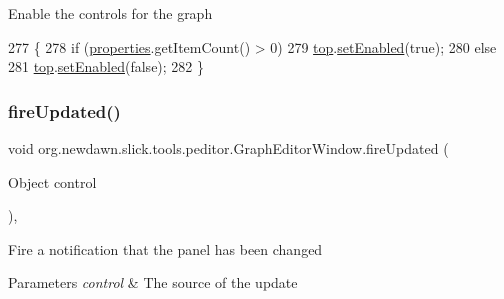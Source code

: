 Enable the controls for the graph 
\begin{DoxyCode}
277                                   \{
278         \textcolor{keywordflow}{if} (\mbox{\hyperlink{classorg_1_1newdawn_1_1slick_1_1tools_1_1peditor_1_1_graph_editor_window_ac9d1313ef13023ef8d250b689e52ff12}{properties}}.getItemCount() > 0)
279             \mbox{\hyperlink{classorg_1_1newdawn_1_1slick_1_1tools_1_1peditor_1_1_graph_editor_window_a1c8bea1ddf9867ec10b2347657b369f3}{top}}.\mbox{\hyperlink{classorg_1_1newdawn_1_1slick_1_1tools_1_1peditor_1_1_default_panel_ae7d7b9c33e70e3725f76d561955aac38}{setEnabled}}(\textcolor{keyword}{true});
280         \textcolor{keywordflow}{else}
281             \mbox{\hyperlink{classorg_1_1newdawn_1_1slick_1_1tools_1_1peditor_1_1_graph_editor_window_a1c8bea1ddf9867ec10b2347657b369f3}{top}}.\mbox{\hyperlink{classorg_1_1newdawn_1_1slick_1_1tools_1_1peditor_1_1_default_panel_ae7d7b9c33e70e3725f76d561955aac38}{setEnabled}}(\textcolor{keyword}{false});
282     \}
\end{DoxyCode}
\mbox{\label{classorg_1_1newdawn_1_1slick_1_1tools_1_1peditor_1_1_graph_editor_window_a2e90faf9e804d890ac95835230002850}} 
\subsubsection{\texorpdfstring{fire\+Updated()}{fireUpdated()}}
{\footnotesize\ttfamily void org.\+newdawn.\+slick.\+tools.\+peditor.\+Graph\+Editor\+Window.\+fire\+Updated (\begin{DoxyParamCaption}\item[{Object}]{control }\end{DoxyParamCaption})\hspace{0.3cm}{\ttfamily [inline]}, {\ttfamily [private]}}

Fire a notification that the panel has been changed


\begin{DoxyParams}{Parameters}
{\em control} & The source of the update \\
\hline
\end{DoxyParams}

